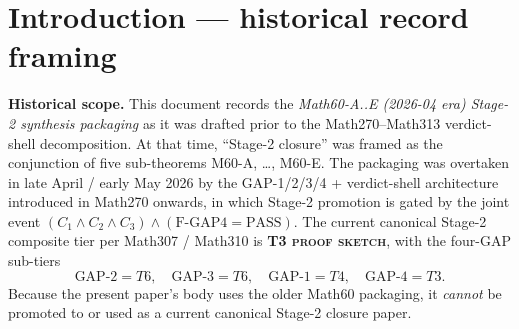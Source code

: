 \begin{abstract}
This document is preserved as a historical Stage-2 synthesis draft
(Math60-A..E old packaging) for the Topological Energy Condensate
Theory (TECT). External use is FORBIDDEN at the present canonical
tier per the Math314-AddD audit, because the original abstract /
introduction wording (``Stage-2 global closure theorem'' / ``quantum
completion'' / ``structural integrity established'') is incompatible
with the current canonical bookkeeping:
\[
\text{GAP-2}=T6,\ \text{GAP-3}=T6,\ \text{GAP-1}=T4,\ \text{GAP-4}=T3,
\quad
\text{Stage-2 composite} = \min = T3.
\]
Stage-2 promotion requires the joint event
$(C_1 \wedge C_2 \wedge C_3) \wedge (\text{F-GAP4}=\text{PASS})$ per
Math307 / Math310 / Math311 latest synthesis; none of these gates
have arrived at the present date. The original Math60-A..E
five-sub-theorem packaging predates the GAP-1/2/3/4 +
verdict-shell decomposition that Math270--313 introduced; this draft
is therefore a chronological-record artefact, not a current
canonical claim. Refer to the canonical
\texttt{Docs/status/TOE-FACT-SHEET.md} and to Paper-12 successor
drafts (when available) for the current Stage-2 status.
\end{abstract}

\maketitle

\section{Introduction --- historical record framing}
\label{sec:intro}

\textbf{Historical scope.} This document records the
\emph{Math60-A..E (2026-04 era) Stage-2 synthesis packaging} as it
was drafted prior to the Math270--Math313 verdict-shell decomposition.
At that time, ``Stage-2 closure'' was framed as the conjunction of
five sub-theorems M60-A, \dots, M60-E. The packaging was overtaken
in late April / early May 2026 by the GAP-1/2/3/4 +
verdict-shell architecture introduced in Math270 onwards, in which
Stage-2 promotion is gated by the joint event
$(C_1 \wedge C_2 \wedge C_3) \wedge (\text{F-GAP4} = \text{PASS})$.
The current canonical Stage-2 composite tier per Math307 / Math310 is
\textbf{T3 \textsc{proof sketch}}, with the four-GAP sub-tiers
\[
  \text{GAP-2}=T6,\quad \text{GAP-3}=T6,\quad \text{GAP-1}=T4,\quad
  \text{GAP-4}=T3.
\]
Because the present paper's body uses the older Math60 packaging, it
\emph{cannot} be promoted to or used as a current canonical
Stage-2 closure paper.

